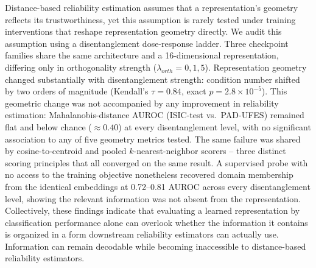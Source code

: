 %

Distance-based reliability estimation assumes that a representation's
geometry reflects its trustworthiness, yet this assumption is rarely tested
under training interventions that reshape representation geometry directly.
We audit this assumption using a disentanglement dose-response ladder. Three
checkpoint families share the same architecture and a 16-dimensional
representation, differing only in orthogonality strength
($\lambda_{orth} = 0, 1, 5$). Representation geometry changed
substantially with disentanglement strength: condition number shifted by
two orders of magnitude (Kendall's $\tau=0.84$, exact $p=2.8\times10^{-5}$).
This geometric change was not accompanied by any improvement in reliability
estimation: Mahalanobis-distance AUROC (ISIC-test vs.\ PAD-UFES) remained
flat and below chance ($\approx 0.40$) at every disentanglement level, with
no significant association to any of five geometry metrics tested. The same
failure was shared by cosine-to-centroid and pooled $k$-nearest-neighbor
scorers -- three distinct scoring principles that all
converged on the same result. A supervised probe with no access to the
training objective nonetheless recovered domain membership from the
identical embeddings at 0.72--0.81 AUROC across every disentanglement level,
showing the relevant information was not absent from the representation.
Collectively, these findings indicate that evaluating a learned representation by
classification performance alone can overlook whether the information it
contains is organized in a form downstream reliability estimators can
actually use. Information can remain decodable while becoming inaccessible
to distance-based reliability estimators.
